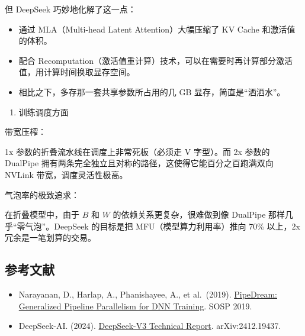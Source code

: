 但 DeepSeek 巧妙地化解了这一点：

\begin{itemize}
\tightlist
\item
  通过 MLA（Multi-head Latent Attention）大幅压缩了 KV Cache 和激活值的体积。
\item
  配合 Recomputation（激活值重计算）技术，可以在需要时再计算部分激活值，用计算时间换取显存空间。
\item
  相比之下，多存那一套共享参数所占用的几 GB 显存，简直是``洒洒水''。
\end{itemize}

\begin{enumerate}
\def\labelenumi{\arabic{enumi}.}
\setcounter{enumi}{2}
\tightlist
\item
  训练调度方面
\end{enumerate}

带宽压榨：

1x 参数的折叠流水线在调度上非常死板（必须走 V 字型）。而 2x 参数的 DualPipe 拥有两条完全独立且对称的路径，这使得它能百分之百跑满双向 NVLink 带宽，调度灵活性极高。

气泡率的极致追求：

在折叠模型中，由于 \(B\) 和 \(W\) 的依赖关系更复杂，很难做到像 DualPipe 那样几乎``零气泡''。DeepSeek 的目标是把 MFU（模型算力利用率）推向 70\% 以上，2x 冗余是一笔划算的交易。

\hypertarget{ux53c2ux8003ux6587ux732e-37}{%
\subsection{参考文献}\label{ux53c2ux8003ux6587ux732e-37}}

\vspace{0.25em}
\begin{itemize}
\tightlist
\item
  Narayanan, D., Harlap, A., Phanishayee, A., et al.~(2019). \href{https://dl.acm.org/doi/10.1145/3341301.3359646}{PipeDream: Generalized Pipeline Parallelism for DNN Training}. SOSP 2019.
\item
  DeepSeek-AI. (2024). \href{https://arxiv.org/abs/2412.19437}{DeepSeek-V3 Technical Report}. arXiv:2412.19437.
\end{itemize}

\clearpage
